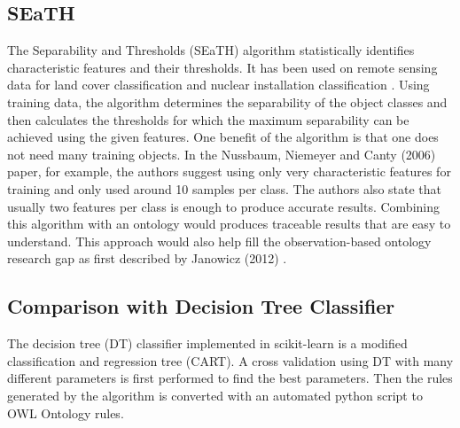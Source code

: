 \documentclass[authoryear, review,12pt,number]{elsarticle}
\begin{document}
\subsection{SEaTH} The Separability and Thresholds (SEaTH) algorithm
\citep{Nussbaum2006} statistically identifies characteristic features and their thresholds. It has
been used on remote sensing data for land cover classification \citep{Gao2011}
and nuclear installation classification \citep{Nussbaum2006}.
Using training data, the algorithm determines the separability of the object
classes and then calculates the thresholds for which the maximum separability
can be achieved using the given features. One benefit of the algorithm is that
one does not need many training objects.
In the Nussbaum, Niemeyer and Canty (2006) paper, for example, the authors
suggest using only very characteristic features for training and only used
around 10 samples per class\citep{Nussbaum2006}. The authors also state that
usually two features per class is enough to produce accurate results. Combining
this algorithm with an ontology would produces traceable results that are easy
to understand. This approach would also help fill the observation-based ontology
research gap as first described by Janowicz (2012) \citep{Janowicz2012}.

\subsection{Comparison with Decision Tree Classifier}
The decision tree (DT) classifier implemented in scikit-learn is a modified
classification and regression tree (CART)\citep{scikit-learn}. A cross
validation using DT with many different parameters is first performed to find the best
parameters. Then the rules generated by the algorithm is converted with an
automated python script to OWL Ontology rules.

%
\end{document}

